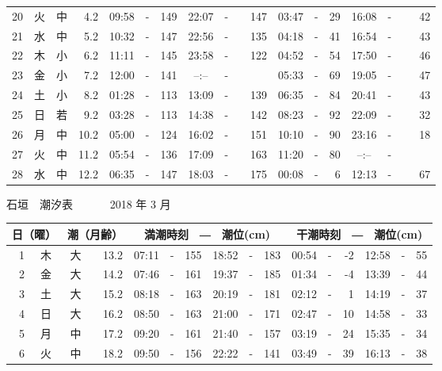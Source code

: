 \documentclass[12pt.a4j]{jsarticle}
\begin{document}
\begin{center}
\begin{table}[ht]
\begin{tabular}{|rc|cr|ccrccr|ccrccr|}
20 & 火 & 中 &  4.2 &  09:58 &-& 149  &  22:07 &-& 147  &   03:47 &-&  29  &   16:08 &-&  42  \\
21 & 水 & 中 &  5.2 &  10:32 &-& 147  &  22:56 &-& 135  &   04:18 &-&  41  &   16:54 &-&  43  \\
22 & 木 & 小 &  6.2 &  11:11 &-& 145  &  23:58 &-& 122  &   04:52 &-&  54  &   17:50 &-&  46  \\
23 & 金 & 小 &  7.2 &  12:00 &-& 141  &  --:-- &-&~~~~~ &   05:33 &-&  69  &   19:05 &-&  47  \\
24 & 土 & 小 &  8.2 &  01:28 &-& 113  &  13:09 &-& 139  &   06:35 &-&  84  &   20:41 &-&  43  \\
25 & 日 & 若 &  9.2 &  03:28 &-& 113  &  14:38 &-& 142  &   08:23 &-&  92  &   22:09 &-&  32  \\
26 & 月 & 中 & 10.2 &  05:00 &-& 124  &  16:02 &-& 151  &   10:10 &-&  90  &   23:16 &-&  18  \\
27 & 火 & 中 & 11.2 &  05:54 &-& 136  &  17:09 &-& 163  &   11:20 &-&  80  &   --:-- &-&~~~~~ \\
28 & 水 & 中 & 12.2 &  06:35 &-& 147  &  18:03 &-& 175  &   00:08 &-&   6  &   12:13 &-&  67  \\
   \hline
   \end{tabular}
\end{table}
\newpage
 {\LARGE 石垣　潮汐表　　　}
 {\large 2018 年  3 月}\\
 \begin{table}[ht]
    \begin{tabular}{|rc|cr|ccrccr|ccrccr|}
    \hline
    \multicolumn{2}{|c|}{日（曜）} & \multicolumn{2}{c|}{潮（月齢）} & \multicolumn{6}{c|}{満潮時刻　―　潮位(cm)} & \multicolumn{6}{c|}{干潮時刻　―　潮位(cm)} \\
 \hline
 1 & 木 & 大 & 13.2 &  07:11 &-& 155  &  18:52 &-& 183  &   00:54 &-&  -2  &   12:58 &-&  55  \\
 2 & 金 & 大 & 14.2 &  07:46 &-& 161  &  19:37 &-& 185  &   01:34 &-&  -4  &   13:39 &-&  44  \\
 3 & 土 & 大 & 15.2 &  08:18 &-& 163  &  20:19 &-& 181  &   02:12 &-&   1  &   14:19 &-&  37  \\
 4 & 日 & 大 & 16.2 &  08:50 &-& 163  &  21:00 &-& 171  &   02:47 &-&  10  &   14:58 &-&  33  \\
 5 & 月 & 中 & 17.2 &  09:20 &-& 161  &  21:40 &-& 157  &   03:19 &-&  24  &   15:35 &-&  34  \\
 6 & 火 & 中 & 18.2 &  09:50 &-& 156  &  22:22 &-& 141  &   03:49 &-&  39  &   16:13 &-&  38  \\

\end{tabular}
\end{table}
\end{center}
\end{document}

